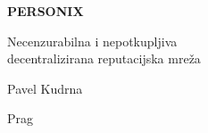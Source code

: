 \thispagestyle{empty}
\begin{center}
  {\sffamily\bfseries\fontsize{34}{40}\selectfont PERSONIX\par}
  \vspace{2.2em}
  {\rmfamily\large Necenzurabilna i nepotkupljiva\\[0.25em]
   decentralizirana reputacijska mreža\par}
\end{center}
\begin{center}
  {\rmfamily\Large Pavel Kudrna\par}
  \vspace{0.45em}
  {\rmfamily\small Prag\quad\textbullet{}\par}
\end{center}
\clearpage
